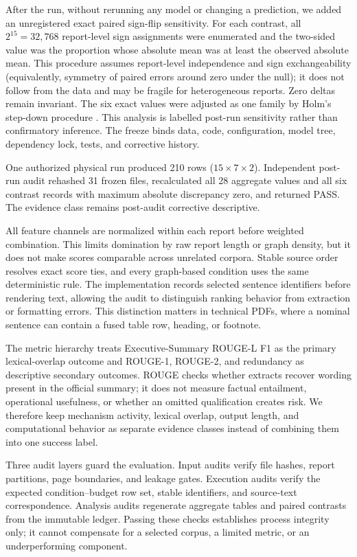 \documentclass[applsci,article,submit,moreauthors]{Definitions/mdpi}
\begin{document}
After the run, without rerunning any model or changing a prediction, we added an unregistered exact paired sign-flip sensitivity. For each contrast, all $2^{15}=32{,}768$ report-level sign assignments were enumerated and the two-sided value was the proportion whose absolute mean was at least the observed absolute mean. This procedure assumes report-level independence and sign exchangeability (equivalently, symmetry of paired errors around zero under the null); it does not follow from the data and may be fragile for heterogeneous reports. Zero deltas remain invariant. The six exact values were adjusted as one family by Holm's step-down procedure \cite{holm1979simple}. This analysis is labelled post-run sensitivity rather than confirmatory inference. The freeze binds data, code, configuration, model tree, dependency lock, tests, and corrective history.

One authorized physical run produced 210 rows ($15\times7\times2$). Independent post-run audit rehashed 31 frozen files, recalculated all 28 aggregate values and all six contrast records with maximum absolute discrepancy zero, and returned PASS. The evidence class remains post-audit corrective descriptive.

All feature channels are normalized within each report before weighted combination. This limits domination by raw report length or graph density, but it does not make scores comparable across unrelated corpora. Stable source order resolves exact score ties, and every graph-based condition uses the same deterministic rule. The implementation records selected sentence identifiers before rendering text, allowing the audit to distinguish ranking behavior from extraction or formatting errors. This distinction matters in technical PDFs, where a nominal sentence can contain a fused table row, heading, or footnote.

The metric hierarchy treats Executive-Summary ROUGE-L F1 as the primary lexical-overlap outcome and ROUGE-1, ROUGE-2, and redundancy as descriptive secondary outcomes. ROUGE checks whether extracts recover wording present in the official summary; it does not measure factual entailment, operational usefulness, or whether an omitted qualification creates risk. We therefore keep mechanism activity, lexical overlap, output length, and computational behavior as separate evidence classes instead of combining them into one success label.

Three audit layers guard the evaluation. Input audits verify file hashes, report partitions, page boundaries, and leakage gates. Execution audits verify the expected condition--budget row set, stable identifiers, and source-text correspondence. Analysis audits regenerate aggregate tables and paired contrasts from the immutable ledger. Passing these checks establishes process integrity only; it cannot compensate for a selected corpus, a limited metric, or an underperforming component.
\end{document}
